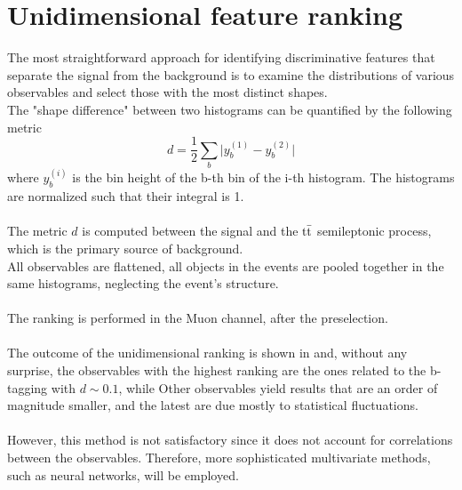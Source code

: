 \begin{minipage}[H]{\linewidth}
\begin{minipage}{0.35\linewidth}
        \label{fig:1Drank}
\end{minipage}
\hfill
\begin{minipage}{0.62\linewidth}
\section{Unidimensional feature ranking}
The most straightforward approach for identifying discriminative features that separate the signal from the background is to examine the distributions of various observables and select those with the most distinct shapes.\\
The "shape difference" between two histograms can be quantified by the following metric
\begin{equation}
    d=\frac{1}{2}\sum_b \bigg| y_b^{(1)}-y_b^{(2)} \bigg|
\end{equation}
where $y_b^{(i)}$ is the bin height of the b-th bin of the i-th histogram. The histograms are normalized such that their integral is 1.\\
\\
The metric $d$ is computed between the signal and the ${{\text{t}}{\bar{\text{t}}}}$ semileptonic process, which is the primary source of background.\\
All observables are flattened, \ie all objects in the events are pooled together in the same histograms, neglecting the event's structure.\\
\\
The ranking is performed in the Muon channel, after the preselection.\\\\
The outcome of the unidimensional ranking is shown in  and, without any surprise, the observables with the highest ranking are the ones related to the b-tagging with $d\sim 0.1$, while Other observables yield results that are an order of magnitude smaller, and the latest are due mostly to statistical fluctuations.\\
\\
However, this method is not satisfactory since it does not account for correlations between the observables. Therefore, more sophisticated multivariate methods, such as neural networks, will be employed.\\\\\\\\\\    
\end{minipage}
\end{minipage}
